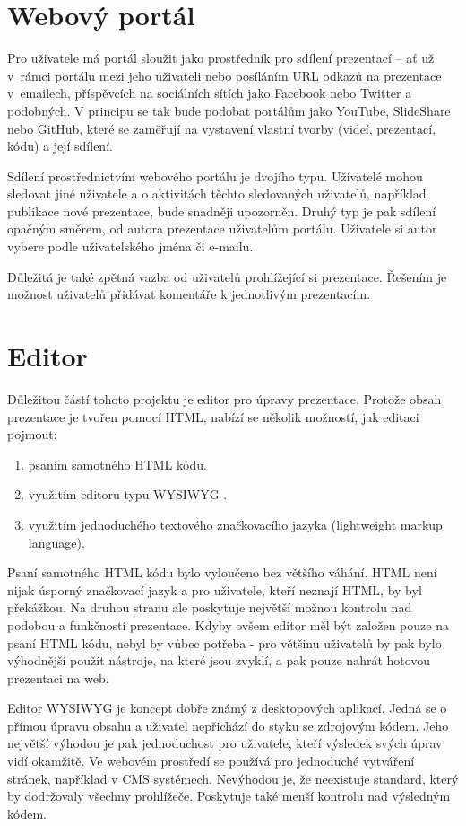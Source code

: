 \documentclass[11pt,twoside,a4paper]{book}
\newcommand*{\nom}[2]{#1 \nomenclature{#1}{#2}} 			%
\begin{document}
\section{Webový portál}
Pro uživatele má portál sloužit jako prostředník pro sdílení prezentací – ať už v~rámci portálu mezi jeho uživateli nebo
posíláním URL odkazů na prezentace v~emailech, příspěvcích na sociálních sítích jako Facebook nebo Twitter a podobných. V principu se tak bude podobat portálům jako YouTube, SlideShare nebo GitHub, které se zaměřují na vystavení vlastní tvorby (videí, prezentací, kódu) a její sdílení.

Sdílení prostřednictvím webového portálu je dvojího typu. Uživatelé mohou sledovat jiné uživatele a o aktivitách těchto sledovaných uživatelů, například publikace nové prezentace, bude snadněji upozorněn. Druhý typ je pak sdílení opačným směrem, od autora prezentace uživatelům portálu. Uživatele si autor vybere podle uživatelského jména či e-mailu.

Důležitá je také zpětná vazba od uživatelů prohlížející si prezentace. Řešením je možnost uživatelů přidávat komentáře k jednotlivým prezentacím.

\section{Editor}
Důležitou částí tohoto projektu je editor pro úpravy prezentace. Protože obsah prezentace je tvořen pomocí HTML, nabízí se
několik možností, jak editaci pojmout:

\begin{enumerate}
	\item psaním samotného HTML kódu.
	\item využitím editoru typu \nom{WYSIWYG}{What You See Is What You Get}.
	\item využitím jednoduchého textového značkovacího jazyka (lightweight markup language).
\end{enumerate}

Psaní samotného HTML kódu bylo vyloučeno bez většího váhání. HTML není nijak úsporný značkovací jazyk a pro uživatele, kteří neznají HTML, by byl překážkou. Na druhou stranu ale poskytuje největší možnou kontrolu nad podobou a funkčností prezentace. Kdyby ovšem editor měl být založen pouze na psaní HTML kódu, nebyl by vůbec potřeba - pro většinu uživatelů by pak bylo výhodnější použít nástroje, na které jsou zvyklí, a pak pouze nahrát hotovou prezentaci na web.

Editor WYSIWYG je koncept dobře známý z desktopových aplikací. Jedná se o přímou úpravu obsahu a uživatel nepřichází do styku se zdrojovým kódem. Jeho největší výhodou je pak jednoduchost pro uživatele, kteří výsledek svých úprav vidí okamžitě. Ve webovém prostředí se používá pro jednoduché vytváření stránek, například v CMS systémech. Nevýhodou je, že neexistuje standard, který by dodržovaly všechny prohlížeče. Poskytuje také menší kontrolu nad výsledným kódem. 
\end{document}
